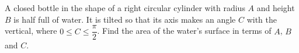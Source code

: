 A closed bottle in the shape of a right circular cylinder with radius $A$ and height $B$ is half full of water. It is tilted so that its axis makes an angle $C$ with the vertical, where $0\le C\le\dfrac{\pi}{2}$. Find the area of the water's surface in terms of $A$, $B$ and $C$.
